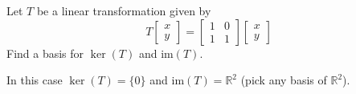 \documentclass{ximera}
\begin{document}
\begin{problem}\label{prb:6.29}
 Let $T$ be a linear transformation given by
\[
T \left[ \begin{array}{r}
x\\
y
\end{array}\right] = \left[ \begin{array}{rrr}
1 & 0  \\
1 & 1
\end{array}\right]
\left[ \begin{array}{r}
x\\
y
\end{array}\right]
\]
Find a basis for $\ker \left( T\right)$ and $\mbox{im}
\left( T\right) $.

\begin{hint}
In this case $\ker \left( T\right) =\{0\}$
and $\mbox{im} \left( T\right) = \mathbb{R}^2$ (pick any basis of $\mathbb{R}^2$).
\end{hint}

\end{problem}




\end{document}
